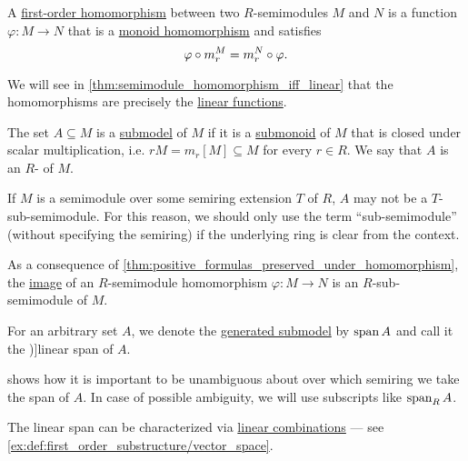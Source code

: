 \begin{definition}
\begin{thmenum}[resume=def:semimodule]
     A \hyperref[def:first_order_homomorphism]{first-order homomorphism} between two \( R \)-semimodules \( M \) and \( N \) is a function \( \varphi: M \to N \) that is a \hyperref[def:monoid/homomorphism]{monoid homomorphism} and satisfies
    \begin{equation}\label{eq:def:semimodule/homomorphism/compatibility}
      \varphi \bincirc m_r^M = m_r^N \bincirc \varphi.
    \end{equation}

    We will see in \cref{thm:semimodule_homomorphism_iff_linear} that the homomorphisms are precisely the \hyperref[def:linear_function]{linear functions}.

     The set \( A \subseteq M \) is a \hyperref[def:first_order_submodel]{submodel} of \( M \) if it is a \hyperref[def:monoid/submodel]{submonoid} of \( M \) that is closed under scalar multiplication, i.e. \( rM = m_r[M] \subseteq M \) for every \( r \in R \). We say that \( A \) is an \( R \)- of \( M \).

    If \( M \) is a semimodule over some semiring extension \( T \) of \( R \), \( A \) may not be a \( T \)-sub-semimodule. For this reason, we should only use the term \enquote{sub-semimodule} (without specifying the semiring) if the underlying ring is clear from the context.

    As a consequence of \cref{thm:positive_formulas_preserved_under_homomorphism}, the \hyperref[def:set_valued_map/image]{image} of an \( R \)-semimodule homomorphism \( \varphi: M \to N \) is an \( R \)-sub-semimodule of \( M \).

    \mimprovised For an arbitrary set \( A \), we denote the \hyperref[def:first_order_generated_substructure]{generated submodel} by \( \operatorname{span}{ A } \) and call it the \term[ru=линейная оболочка (\cite[sec. 3.2]{Тыртышников2007ЛинейнаяАлгебра})]{linear span} of \( A \).

     shows how it is important to be unambiguous about over which semiring we take the span of \( A \). In case of possible ambiguity, we will use subscripts like \( \operatorname{span}_R A \).

    The linear span can be characterized via \hyperref[def:linear_combination]{linear combinations} --- see \cref{ex:def:first_order_substructure/vector_space}.


\end{thmenum}
\end{definition}
